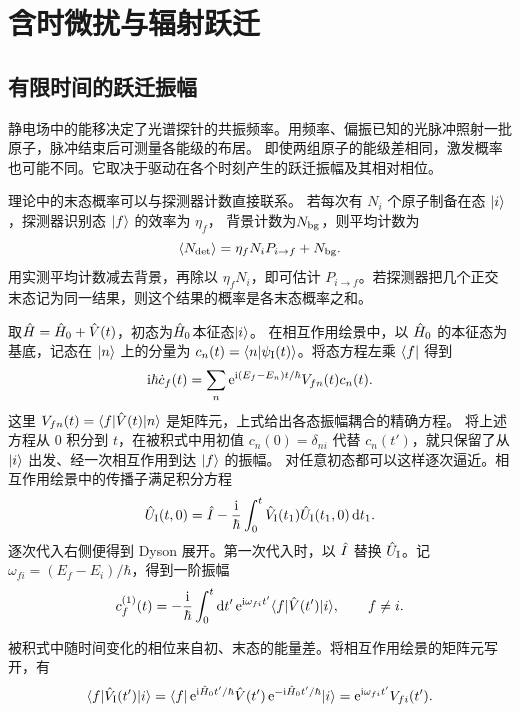 \chapter{含时微扰与辐射跃迁}
\label{ch:transitions}

\section{有限时间的跃迁振幅}
静电场中的能移决定了光谱探针的共振频率。用频率、偏振已知的光脉冲照射一批原子，脉冲结束后可测量各能级的布居。
即使两组原子的能级差相同，激发概率也可能不同。它取决于驱动在各个时刻产生的跃迁振幅及其相对相位。

理论中的末态概率可以与探测器计数直接联系。
若每次有 $N_i$ 个原子制备在态 $\lvert i\rangle$，探测器识别态 $\lvert f\rangle$ 的效率为 $\eta_f$，
背景计数为$N_{\mathrm{bg}}$，则平均计数为
\begin{equation}
    \langle N_{\mathrm{det}}\rangle = \eta_f N_i P_{i\to f} + N_{\mathrm{bg}}.
\end{equation}
用实测平均计数减去背景，再除以 $\eta_f N_i$，即可估计 $P_{i\to f}$。若探测器把几个正交末态记为同一结果，则这个结果的概率是各末态概率之和。

取$\hat{H} = \hat{H}_0 + \hat{V}(t)$，初态为$\hat{H}_0$本征态$\lvert i\rangle$。
在相互作用绘景中，以 $\hat{H}_0$ 的本征态为基底，记态在 $\lvert n\rangle$ 上的分量为
$c_n(t) = \langle n\vert\psi_{\mathrm{I}}(t)\rangle$。将态方程左乘 $\langle f\rvert$ 得到
\begin{equation}
    \mathrm{i}\hbar\dot c_f(t)
    = \sum_n\mathop{}\!\mathrm{e}^{\mathrm{i}(E_f-E_n)t/\hbar}V_{fn}(t)c_n(t).
\end{equation}
这里 $V_{fn}(t) = \langle f\vert\hat{V}(t)\vert n\rangle$ 是矩阵元，上式给出各态振幅耦合的精确方程。
将上述方程从 $0$ 积分到 $t$，在被积式中用初值 $c_n(0) = \delta_{ni}$ 代替 $c_n(t')$，就只保留了从 $\lvert i\rangle$ 出发、经一次相互作用到达 $\lvert f\rangle$ 的振幅。
对任意初态都可以这样逐次逼近。相互作用绘景中的传播子满足积分方程
\begin{equation}
    \hat{U}_{\mathrm{I}}(t,0) = \hat{I} - \frac{\mathrm{i}}\hbar\int_0^t\hat{V}_{\mathrm{I}}(t_1)\hat{U}_{\mathrm{I}}(t_1,0)\mathop{}\!\mathrm{d} t_1.
\end{equation}
逐次代入右侧便得到 Dyson 展开。第一次代入时，以 $\hat{I}$ 替换 $\hat{U}_{\mathrm{I}}$。记 $\omega_{fi} = (E_f - E_i)/\hbar$，得到一阶振幅
\begin{equation}
    c_f^{(1)}(t) = -\frac{\mathrm{i}}\hbar\int_0^t\mathop{}\!\mathrm{d} t'\mathop{}\!\mathrm{e}^{\mathrm{i}\omega_{fi}t'}\langle f\vert\hat{V}(t')\vert i\rangle,
    \qquad f \ne i.
\end{equation}

被积式中随时间变化的相位来自初、末态的能量差。将相互作用绘景的矩阵元写开，有
\begin{equation}
    \langle f\vert\hat{V}_{\mathrm{I}}(t')\vert i\rangle
    = \langle f\vert\mathop{}\!\mathrm{e}^{\mathrm{i} \hat{H}_0t'/\hbar}\hat{V}(t')\mathop{}\!\mathrm{e}^{-\mathrm{i} \hat{H}_0t'/\hbar}\vert i\rangle
    = \mathop{}\!\mathrm{e}^{\mathrm{i}\omega_{fi}t'}V_{fi}(t').
\end{equation}

